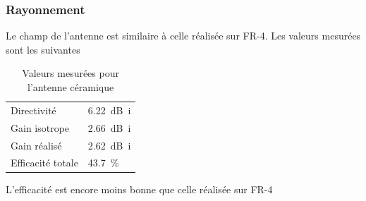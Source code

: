\documentclass[Deriaz_Traiber_Labo02.tex]{subfiles}
\begin{document}
\subsubsection{Rayonnement}
Le champ de l'antenne est similaire à celle réalisée sur FR-4. Les valeurs mesurées sont les suivantes
\begin{table}[H]
\centering
\begin{tabular}{ll}
Directivité & \SI{6.22}{\deci\bel i}\\
Gain isotrope & \SI{2.66}{\deci\bel i}\\
Gain réalisé & \SI{2.62}{\deci\bel i}\\
Efficacité totale & \SI{43.7}{\percent}
\end{tabular}
\caption{Valeurs mesurées pour l'antenne céramique}
\end{table}
L'efficacité est encore moins bonne que celle réalisée sur FR-4
\end{document}
